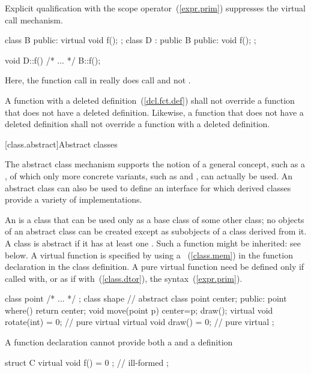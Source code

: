 \pnum
{}%
%
Explicit qualification with the scope operator~(\ref{expr.prim})
suppresses the virtual call mechanism.
\enterexample
\begin{codeblock}
class B { public: virtual void f(); };
class D : public B { public: void f(); };

void D::f() { /* ... */ B::f(); }
\end{codeblock}

Here, the function call in
really does call
and not
.
\exitexample

\pnum
A function with a deleted definition~(\ref{dcl.fct.def}) shall
not override a function that does not have a deleted definition. Likewise,
a function that does not have a deleted definition shall not override a
function with a deleted definition.%

[class.abstract]{Abstract classes}%

\pnum
\enternote 
The abstract class mechanism supports the notion of a general concept,
such as a , of which only more concrete variants, such as
 and , can actually be used. An abstract
class can also be used to define an interface for which derived classes
provide a variety of implementations.
\exitnote

\pnum
An  is a class that can be used only
as a base class of some other class; no objects of an abstract class can
be created except as subobjects of a class derived from it. A class is
abstract if it has at least one .
\enternote
Such a function might be inherited: see below.
\exitnote
{}%
A virtual function is specified  by using a
~(\ref{class.mem}) in the function declaration
in the class definition.
%
A pure virtual function need be defined only if called with, or as if
with~(\ref{class.dtor}), the 
syntax~(\ref{expr.prim}).
\enterexample
{}%
\begin{codeblock}
class point { /* ... */ };
class shape {                   // abstract class
  point center;
public:
  point where() { return center; }
  void move(point p) { center=p; draw(); }
  virtual void rotate(int) = 0; // pure virtual
  virtual void draw() = 0;      // pure virtual
};
\end{codeblock}
\exitexample
\enternote
A function declaration cannot provide both a 
and a definition
\exitnote
\enterexample
\begin{codeblock}
struct C {
  virtual void f() = 0 { };     // ill-formed
};
\end{codeblock}
\exitexample

